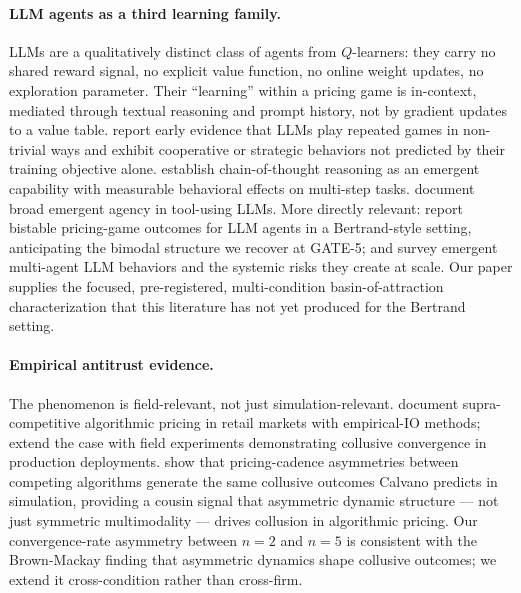 \paragraph{LLM agents as a third learning family.}
LLMs are a qualitatively distinct class of agents from $Q$-learners: they carry no shared reward signal, no explicit value function, no online weight updates, no exploration parameter. Their ``learning'' within a pricing game is in-context, mediated through textual reasoning and prompt history, not by gradient updates to a value table. \citet{akata2023playing} report early evidence that LLMs play repeated games in non-trivial ways and exhibit cooperative or strategic behaviors not predicted by their training objective alone. \citet{wei2022cot} establish chain-of-thought reasoning as an emergent capability with measurable behavioral effects on multi-step tasks. \citet{brown2024monkeys} document broad emergent agency in tool-using LLMs. More directly relevant: \citet{Cao_2026_llm_collusion} report bistable pricing-game outcomes for LLM agents in a Bertrand-style setting, anticipating the bimodal structure we recover at GATE-5; and \citet{Hammond_2025_multiagent_risks,Riedl_2025_emergent} survey emergent multi-agent LLM behaviors and the systemic risks they create at scale. Our paper supplies the focused, pre-registered, multi-condition basin-of-attraction characterization that this literature has not yet produced for the Bertrand setting.

\paragraph{Empirical antitrust evidence.}
The phenomenon is field-relevant, not just simulation-relevant. \citet{assad_etal_2024_algorithmic_pricing_competition_empirical} document supra-competitive algorithmic pricing in retail markets with empirical-IO methods; \citet{fish2024algorithmicCollusion} extend the case with field experiments demonstrating collusive convergence in production deployments. \citet{BrownMackay_2024_nber_pricing_cadence} show that pricing-cadence asymmetries between competing algorithms generate the same collusive outcomes Calvano predicts in simulation, providing a cousin signal that asymmetric dynamic structure --- not just symmetric multimodality --- drives collusion in algorithmic pricing. Our convergence-rate asymmetry between $n = 2$ and $n = 5$ is consistent with the Brown-Mackay finding that asymmetric dynamics shape collusive outcomes; we extend it cross-condition rather than cross-firm.


